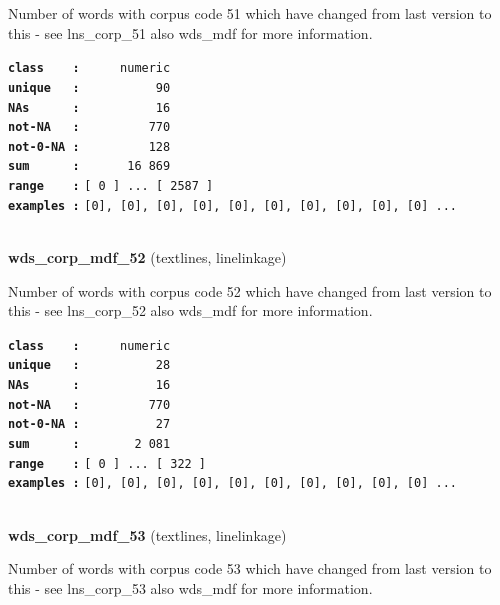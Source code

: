 \documentclass[]{article}
\begin{document}
Number of words with corpus code 51 which have changed from last version
to this - see lns\_corp\_51 also wds\_mdf for more information.

\textbf{\texttt{class\ \ \ \ :}} \texttt{~~~~~numeric}\\
\textbf{\texttt{unique\ \ \ :}} \texttt{~~~~~~~~~~90}\\
\textbf{\texttt{NAs\ \ \ \ \ \ :}} \texttt{~~~~~~~~~~16}\\
\textbf{\texttt{not-NA\ \ \ :}} \texttt{~~~~~~~~~770}\\
\textbf{\texttt{not-0-NA\ :}} \texttt{~~~~~~~~~128}\\
\textbf{\texttt{sum\ \ \ \ \ \ :}} \texttt{~~~~~~16~869}\\
\textbf{\texttt{range\ \ \ \ :}}
\texttt{{[}\ 0\ {]}\ ...\ {[}\ 2587\ {]}}\\
\textbf{\texttt{examples\ :}}
\texttt{{[}0{]},\ {[}0{]},\ {[}0{]},\ {[}0{]},\ {[}0{]},\ {[}0{]},\ {[}0{]},\ {[}0{]},\ {[}0{]},\ {[}0{]}\ ...}\\

~

\textbf{wds\_corp\_mdf\_52} (textlines, linelinkage)

Number of words with corpus code 52 which have changed from last version
to this - see lns\_corp\_52 also wds\_mdf for more information.

\textbf{\texttt{class\ \ \ \ :}} \texttt{~~~~~numeric}\\
\textbf{\texttt{unique\ \ \ :}} \texttt{~~~~~~~~~~28}\\
\textbf{\texttt{NAs\ \ \ \ \ \ :}} \texttt{~~~~~~~~~~16}\\
\textbf{\texttt{not-NA\ \ \ :}} \texttt{~~~~~~~~~770}\\
\textbf{\texttt{not-0-NA\ :}} \texttt{~~~~~~~~~~27}\\
\textbf{\texttt{sum\ \ \ \ \ \ :}} \texttt{~~~~~~~2~081}\\
\textbf{\texttt{range\ \ \ \ :}}
\texttt{{[}\ 0\ {]}\ ...\ {[}\ 322\ {]}}\\
\textbf{\texttt{examples\ :}}
\texttt{{[}0{]},\ {[}0{]},\ {[}0{]},\ {[}0{]},\ {[}0{]},\ {[}0{]},\ {[}0{]},\ {[}0{]},\ {[}0{]},\ {[}0{]}\ ...}\\

~

\textbf{wds\_corp\_mdf\_53} (textlines, linelinkage)

Number of words with corpus code 53 which have changed from last version
to this - see lns\_corp\_53 also wds\_mdf for more information.
\end{document}
